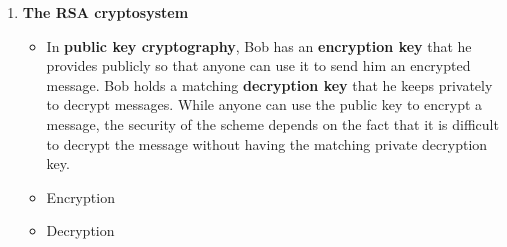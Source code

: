 \documentclass[12pt,a4paper]{article}
\begin{document}
\begin{enumerate}
\begin{itemize}
  \end{itemize}
  \item \textbf{The RSA cryptosystem}
  \begin{itemize}
    \item In \textbf{public key cryptography}, Bob has an \textbf{encryption key} that he provides publicly so that anyone can use it to send him an encrypted message. Bob holds a matching \textbf{decryption key} that he keeps privately to decrypt messages. While anyone can use the public key to encrypt a message, the security of the scheme depends on the fact that it is difficult to decrypt the message without having the matching private decryption key. 
    \item Encryption
    \item Decryption
  \end{itemize}
\end{enumerate}
\end{document}
